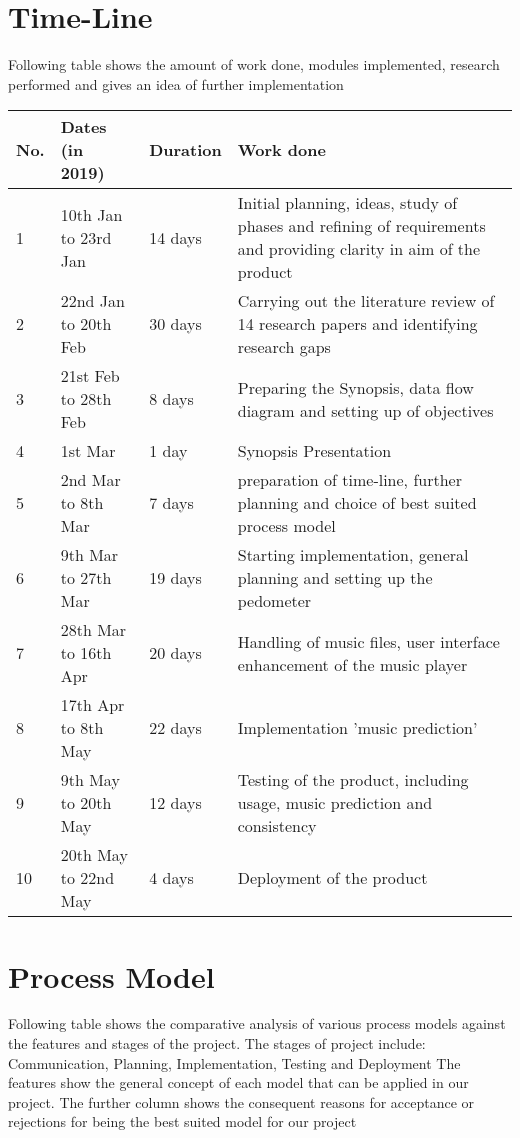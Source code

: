 \documentclass[10pt, a4paper]{article}
\begin{document}
\section{Time-Line}
Following table shows the amount of work done, modules implemented, research performed and gives an idea of further implementation
\begin{center}
\bigbreak
\begin{tabular}{ | m{0.5cm} | m{3.5cm}| m{2cm} | m{9cm}|}
\hline
\hline
No. & Dates (in 2019)& Duration & Work done\\
\hline
\hline 
1 & 10th Jan to 23rd Jan & 14 days & Initial planning, ideas, study of phases and refining of requirements and providing clarity in aim of the product\\
\hline
2 & 22nd Jan to 20th Feb & 30 days & Carrying out the literature review of 14 research papers and identifying research gaps\\
\hline
3 & 21st Feb to 28th Feb & 8 days & Preparing the Synopsis, data flow diagram and setting up of objectives\\
\hline
4 & 1st Mar & 1 day & Synopsis Presentation\\
\hline
5 & 2nd Mar to 8th Mar & 7 days & preparation of time-line, further planning and choice of best suited process model\\
\hline
6 & 9th Mar to 27th Mar & 19 days & Starting implementation, general planning and setting up the pedometer\\
\hline
7 & 28th Mar to 16th Apr & 20 days & Handling of music files, user interface enhancement of the music player\\
\hline
8 & 17th Apr to 8th May & 22 days & Implementation 'music prediction' \\
\hline
9 & 9th May to 20th May & 12 days & Testing of the product, including usage, music prediction and consistency\\
\hline
10 & 20th May to 22nd May & 4 days & Deployment of the product\\
\hline
\end{tabular}
\end{center}



\section{Process Model}
Following table shows the comparative analysis of various process models against the features and stages of the project. The stages of project include: Communication, Planning, Implementation, Testing and Deployment The features show the general concept of each model that can be applied in our project. The further column shows the consequent reasons for acceptance or rejections for being the best suited model for our project  
\end{document}
